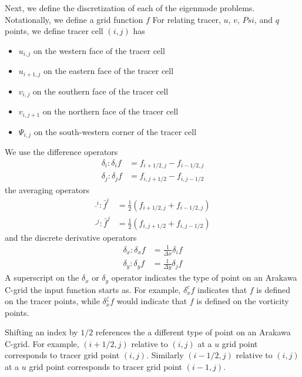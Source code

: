 \documentclass[draft]{agujournal2019}
\begin{document}
Next, we define the discretization of each of the eigenmode problems. Notationally, we define a grid function $f$ For relating tracer, $u$, $v$, $Psi$, and $q$ points, we define tracer cell $(i,j)$ has 
\begin{itemize}
    \item $u_{i,j}$ on the western face of the tracer cell
    \item $u_{i+1,j}$ on the eastern face of the tracer cell
    \item $v_{i,j}$ on the southern face of the tracer cell
    \item $v_{i,j+1}$ on the northern face of the tracer cell
    \item $\Psi_{i,j}$ on the south-western corner of the tracer cell
\end{itemize}
We use the difference operators
\begin{subequations}
    \begin{align}
        \delta_i: \delta_if &= f_{i+1/2,j}-f_{i-1/2,j} \\
        \delta_j: \delta_jf &= f_{i,j+1/2}-f_{i,j-1/2}
    \end{align}
\end{subequations}
the averaging operators
\begin{subequations}
    \begin{align}
        \bar{}^{i}: \bar{f}^{i} &= \frac{1}{2}(f_{i+1/2,j}+f_{i-1/2,j}) \\
        \bar{}^j: \bar{f}^{j} &= \frac{1}{2}(f_{i,j+1/2}+f_{i,j-1/2})
    \end{align}
\end{subequations}
and the discrete derivative operators
\begin{subequations}
    \begin{align}
        \delta_x: \delta_xf &= \frac{1}{\Delta x} \delta_i f \\
        \delta_y: \delta_yf &= \frac{1}{\Delta y} \delta_j f 
    \end{align}
\end{subequations}
A superscript on the $\delta_x$ or $\delta_y$ operator indicates the type of point on an Arakawa C-grid the input function starts as. For example, $\delta_x^c f$ indicates that $f$ is defined on the tracer points, while $\delta_x^\zeta f$ would indicate that $f$ is defined on the vorticity points.

Shifting an index by $1/2$ references the a different type of point on an Arakawa C-grid. For example, $(i+1/2,j)$ relative to $(i,j)$ at a $u$ grid point corresponds to tracer grid point $(i,j)$. Similarly $(i-1/2,j)$ relative to $(i,j)$ at a $u$ grid point corresponds to tracer grid point $(i-1,j)$.
\end{document}
